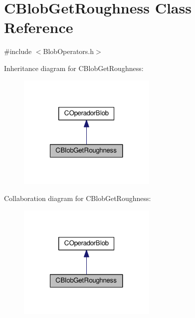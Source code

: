 \hypertarget{classCBlobGetRoughness}{\section{C\-Blob\-Get\-Roughness Class Reference}
\label{classCBlobGetRoughness}
}


{\ttfamily \#include $<$Blob\-Operators.\-h$>$}



Inheritance diagram for C\-Blob\-Get\-Roughness\-:\nopagebreak
\begin{figure}[H]
\begin{center}
\leavevmode
\includegraphics[width=188pt]{classCBlobGetRoughness__inherit__graph}
\end{center}
\end{figure}


Collaboration diagram for C\-Blob\-Get\-Roughness\-:\nopagebreak
\begin{figure}[H]
\begin{center}
\leavevmode
\includegraphics[width=188pt]{classCBlobGetRoughness__coll__graph}
\end{center}
\end{figure}
